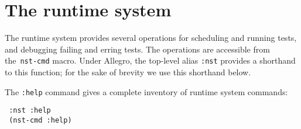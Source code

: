 \section{The runtime system}
The runtime system provides several operations for scheduling and
running tests, and debugging failing and erring tests.  The operations
are accessible from
the~\texttt{nst-cmd} macro.  Under
Allegro, the top-level alias \texttt{:nst}
provides a shorthand to this function; for the sake of brevity we use
this shorthand below.

The \texttt{:help} command gives a complete inventory of runtime
system commands:
\begin{verbatim}
 :nst :help
 (nst-cmd :help)
\end{verbatim}


